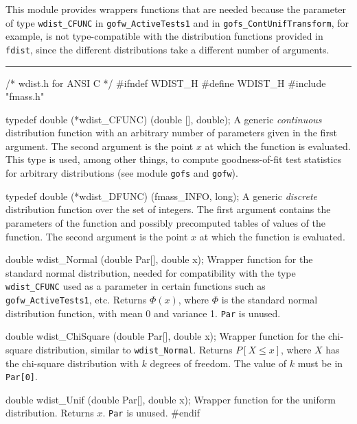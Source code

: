 
This module provides wrappers functions that are needed
because the parameter of type {\tt wdist\_CFUNC} in {\tt gofw\_ActiveTests1}
and in {\tt gofs\_ContUnifTransform}, for example, is not type-compatible
with the distribution functions provided in {\tt fdist}, since the different
distributions take a different number of arguments.


\bigskip\hrule
\code\hide
/* wdist.h for ANSI C */
#ifndef WDIST_H
#define WDIST_H
\endhide
#include "fmass.h"
\endcode



\code

typedef double (*wdist_CFUNC) (double [], double);
\endcode
  \tab A generic {\em continuous\/} distribution function with an 
  arbitrary number of parameters given in the first argument.
  The second argument is the point $x$ at which the function is evaluated.
 \ifdetailed  %
  This type is used, among other things, to compute goodness-of-fit
  test statistics for arbitrary distributions (see module {\tt gofs} and
  {\tt gofw}).
 \fi %
 \endtab
\code


typedef double (*wdist_DFUNC) (fmass_INFO, long);
\endcode
  \tab A generic {\em discrete\/} distribution function over the set of
  integers.
  The first argument contains the parameters of the function and 
  possibly precomputed tables of values of the function.
  The second argument is the point $x$ at which the function is evaluated.
 \endtab




\code

double wdist_Normal (double Par[], double x);
\endcode
\tab
  Wrapper function for the {standard normal} distribution, needed
  for compatibility with the type {\tt wdist\_CFUNC} used as a parameter
  in certain functions such as {\tt gofw\_ActiveTests1}, etc.
  Returns $\Phi(x)$, where $\Phi$ is the standard normal distribution
  function, with mean 0 and variance 1.
  {\tt Par} is unused.
\endtab
\code


double wdist_ChiSquare (double Par[], double x);
\endcode
\tab
   Wrapper function for the {chi-square} distribution, similar to
   {\tt wdist\_Normal}.
   Returns $P[X \le x]$, where $X$ has the chi-square distribution 
   with $k$ degrees of freedom.  The value of $k$ must be in {\tt Par[0]}. 
\endtab
\code


double wdist_Unif (double Par[], double x);
\endcode
\tab
  Wrapper function for the {uniform} distribution.
  Returns $x$. {\tt Par} is unused.
\endtab
\code
\hide
#endif
\endhide
\endcode
